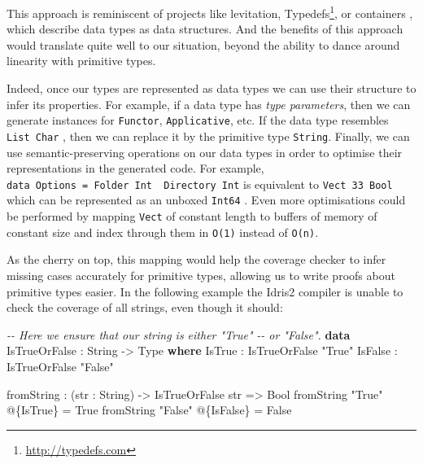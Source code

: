 \documentclass[
]{article}
\newenvironment{Shaded}{}{}
\newcommand{\CommentTok}[1]{\textcolor[rgb]{0.38,0.63,0.69}{\textit{#1}}}
\newcommand{\DataTypeTok}[1]{\textcolor[rgb]{0.56,0.13,0.00}{#1}}
\newcommand{\KeywordTok}[1]{\textcolor[rgb]{0.00,0.44,0.13}{\textbf{#1}}}
\newcommand{\NormalTok}[1]{#1}
\newcommand{\OperatorTok}[1]{\textcolor[rgb]{0.40,0.40,0.40}{#1}}
\newcommand{\OtherTok}[1]{\textcolor[rgb]{0.00,0.44,0.13}{#1}}
\newcommand{\StringTok}[1]{\textcolor[rgb]{0.25,0.44,0.63}{#1}}
\begin{document}
This approach is reminiscent of projects like
levitation\cite{levitation}, Typedefs\footnote{\url{http://typedefs.com}},
or containers\cite{indexed_containers} , which describe data types as
data structures. And the benefits of this approach would translate quite
well to our situation, beyond the ability to dance around linearity with
primitive types.

Indeed, once our types are represented as data types we can use their
structure to infer its properties. For example, if a data type has
\emph{type parameters}, then we can generate instances for
\texttt{Functor}, \texttt{Applicative}, etc. If the data type resembles
\texttt{List\ Char} , then we can replace it by the primitive type
\texttt{String}. Finally, we can use semantic-preserving operations on
our data types in order to optimise their representations in the
generated code. For example,
\texttt{data\ Options\ =\ Folder\ Int\ \textbar{}\ Directory\ Int} is
equivalent to \texttt{Vect\ 33\ Bool} which can be represented as an
unboxed \texttt{Int64} . Even more optimisations could be performed by
mapping \texttt{Vect} of constant length to buffers of memory of
constant size and index through them in \texttt{O(1)} instead of
\texttt{O(n)}.

As the cherry on top, this mapping would help the coverage checker to
infer missing cases accurately for primitive types, allowing us to write
proofs about primitive types easier. In the following example the Idris2
compiler is unable to check the coverage of all strings, even though it
should:

\begin{Shaded}
\begin{Highlighting}[]
\CommentTok{{-}{-} Here we ensure that our string is either "True"}
\CommentTok{{-}{-} or "False".}
\KeywordTok{data} \DataTypeTok{IsTrueOrFalse} \OperatorTok{:} \DataTypeTok{String} \OtherTok{{-}\textgreater{}} \DataTypeTok{Type} \KeywordTok{where}
  \DataTypeTok{IsTrue} \OperatorTok{:} \DataTypeTok{IsTrueOrFalse} \StringTok{"True"}
  \DataTypeTok{IsFalse} \OperatorTok{:} \DataTypeTok{IsTrueOrFalse} \StringTok{"False"}

\NormalTok{fromString }\OperatorTok{:}\NormalTok{ (str }\OperatorTok{:} \DataTypeTok{String}\NormalTok{) }\OtherTok{{-}\textgreater{}} \DataTypeTok{IsTrueOrFalse}\NormalTok{ str }\OtherTok{=\textgreater{}} \DataTypeTok{Bool}
\NormalTok{fromString }\StringTok{"True"} \OperatorTok{@}\NormalTok{\{}\DataTypeTok{IsTrue}\NormalTok{\} }\OtherTok{=} \DataTypeTok{True}
\NormalTok{fromString }\StringTok{"False"} \OperatorTok{@}\NormalTok{\{}\DataTypeTok{IsFalse}\NormalTok{\} }\OtherTok{=} \DataTypeTok{False}
\end{Highlighting}
\end{Shaded}
\end{document}
